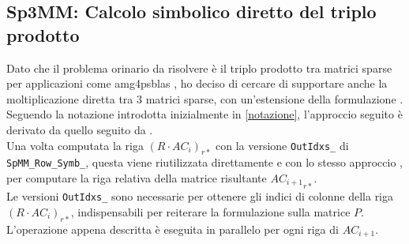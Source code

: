 \subsection{Sp3MM: Calcolo simbolico diretto del triplo prodotto} \label{chSpMMSymb:Sp3MMSymb}
Dato che il problema orinario da risolvere è il triplo prodotto tra matrici sparse per applicazioni come 
amg4psblas \cite{AMG4PSBLAS}, ho deciso di cercare di supportare anche la moltiplicazione diretta 
tra 3 matrici sparse, con un'estensione della formulazione \rowbyrow.\\
Seguendo la notazione introdotta inizialmente in \ref{notazione}, l'approccio seguito è derivato da quello seguito da \cite{Sp3MM4AMG}.\\
Una volta computata la riga $\left(R\cdot AC_i\right)_{r*}$ con la versione \verb|OutIdxs_| di \verb|SpMM_Row_Symb_|, 
questa viene riutilizzata direttamente e con lo stesso approccio \rowbyrow,
per computare la riga relativa della matrice risultante ${AC_{i+1}}_{r*}$.\\ 
Le versioni \verb|OutIdxs_| sono necessarie per ottenere  gli indici di colonne della riga $\left(R\cdot AC_i\right)_{r*}$,
indispensabili per reiterare la formulazione \rowbyrow sulla matrice $P$.\\
L'operazione appena descritta è eseguita in parallelo per ogni riga di $AC_{i+1}$.\\

